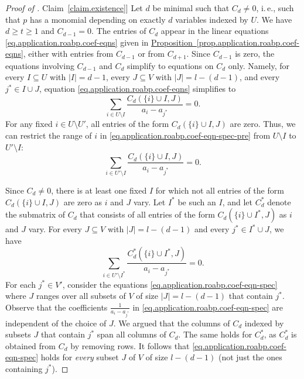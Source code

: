 \documentclass[11pt]{article}
\numberwithin{equation}{section}
\theoremstyle{definition}
\theoremstyle{plain}
\newcommand{\ie}{i.\,e.}
\newcommand{\expref}[2]{\hyperref[#2]{#1~\ref{#2}}}
\newcommand{\minsplitdeg}{t}
\begin{document}
\begin{proof}[Proof of \expref{Claim}{claim.existence}]
  Let \(d\) be minimal such that \(C_d\ne 0\),
  \ie, such that \(p\) has a monomial depending on exactly \(d\) variables
  indexed by \(U\).
  We have \(d \ge \minsplitdeg \ge 1\) and \(C_{d-1} = 0\).
  The entries of \(C_d\) appear in the linear equations
  \eqref{eq.application.roabp.coef-eqns} given in
  \expref{Proposition}{prop.application.roabp.coef-eqns},
  either with entries from \(C_{d-1}\) or from \(C_{d+1}\).
  Since \(C_{d-1}\) is zero,
  the equations involving \(C_{d-1}\) and \(C_d\) simplify to equations on
  \(C_d\) only.
  Namely, for every \(I\subseteq U\) with \(|I|=d-1\),
  every \(J\subseteq V\) with \(|J|=l-(d-1)\),
  and every \(j^* \in I\cup J\),
  equation \eqref{eq.application.roabp.coef-eqns} simplifies to
  \begin{equation}\label{eq.application.roabp.coef-eqn-spec-pre}
    \sum_{i\in U\setminus I} \frac{C_d(\{i\}\cup I, J)}{a_i - a_{j^*}} = 0.
  \end{equation}
  For any fixed $i \in U \setminus U'$,
  all entries of the form $C_d(\{i\}\cup I, J)$ are zero.
  Thus, we can restrict the range of $i$ in
  \eqref{eq.application.roabp.coef-eqn-spec-pre}
  from $U \setminus I$ to $U' \setminus I$:
  \begin{equation}\label{eq.application.roabp.coef-eqn-spec-mid}
    \sum_{i\in U'\setminus I} \frac{C_d(\{i\}\cup I, J)}{a_i - a_{j^*}} = 0.
  \end{equation}

  Since $C_d \ne 0$,
  there is at least one fixed $I$ for which not all entries of the form
  $C_d(\{i\} \cup I, J)$ are zero as \(i\) and \(J\) vary.
  Let $I^*$ be such an $I$,
  and let $C^*_d$ denote the submatrix of $C_d$
  that consists of all entries of the form $C_d(\{i\}\cup I^*,J)$
  as \(i\) and \(J\) vary.
  For every $J \subseteq V$ with $|J|=l-(d-1)$
  and every $j^* \in I^* \cup J$,
  we have
  \begin{equation}\label{eq.application.roabp.coef-eqn-spec}
    \sum_{i\in U'\setminus I^*}
      \frac{C^*_d(\{i\}\cup I^*, J)}{a_i - a_{j^*}}
    = 0.
  \end{equation}
  For each $j^* \in V'$,
  consider the equations \eqref{eq.application.roabp.coef-eqn-spec}
  where $J$ ranges over all subsets of $V$ of size $|J| = l-(d-1)$
  that contain $j^*$.
  Observe that the coefficients $\frac{1}{a_i - a_{j^*}}$ in
  \eqref{eq.application.roabp.coef-eqn-spec} are independent of the choice of
  $J$.
  We argued that the columns of $C_d$ indexed by subsets $J$ that contain
  $j^*$ span all columns of $C_d$.
  The same holds for $C^*_d$,
  as $C^*_d$ is obtained from $C_d$ by removing rows.
  It follows that \eqref{eq.application.roabp.coef-eqn-spec} holds for
  \emph{every} subset $J$ of $V$ of size $l-(d-1)$
  (not just the ones containing $j^*$).


\end{proof}
\end{document}
